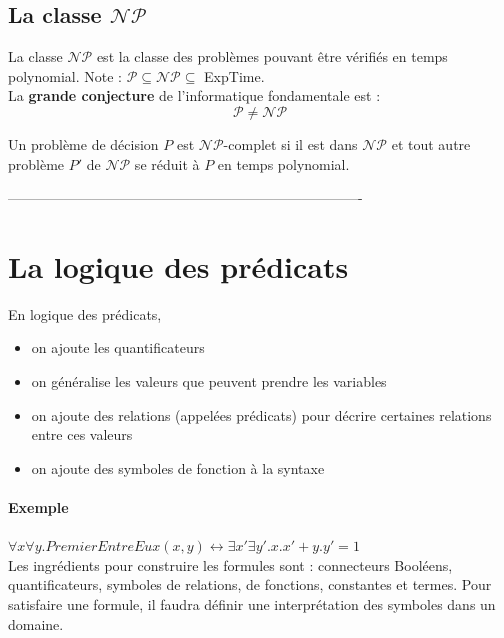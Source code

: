 \documentclass[a4paper]{article}
\begin{document}
  \subsection{La classe $\mathcal{N}\mathcal{P}$}
  La classe $\mathcal{N}\mathcal{P}$ est la classe des problèmes pouvant 
être vérifiés
  en temps polynomial. Note : $\mathcal{P} \subseteq 
\mathcal{N}\mathcal{P} \subseteq$ ExpTime.\\

  La \textbf{grande conjecture} de l'informatique fondamentale est :
  $$ \mathcal{P} \neq \mathcal{N}\mathcal{P} $$

  Un problème de décision $P$ est $\mathcal{N}\mathcal{P}$-complet si il 
est dans
  $\mathcal{N}\mathcal{P}$ et tout autre problème $P'$ de 
$\mathcal{N}\mathcal{P}$
  se réduit à $P$ en temps polynomial.


% 
---------------------------------------------------------------------------- 
%
\section{La logique des prédicats}
  En logique des prédicats,
  \begin{itemize}
    \item on ajoute les quantificateurs
    \item on généralise les valeurs que peuvent prendre les variables
    \item on ajoute des relations (appelées prédicats) pour décrire 
certaines
    relations entre ces valeurs
    \item on ajoute des symboles de fonction à la syntaxe
  \end{itemize}

  \paragraph{Exemple} $\forall x\forall y . PremierEntreEux(x,y) 
\leftrightarrow \exists x' \exists y' . x.x'+y.y' = 1$\\

  Les ingrédients pour construire les formules sont : connecteurs 
Booléens,
  quantificateurs, symboles de relations, de fonctions, constantes et 
termes. Pour
  satisfaire une formule, il faudra définir une interprétation des 
symboles dans un domaine.
\end{document}

